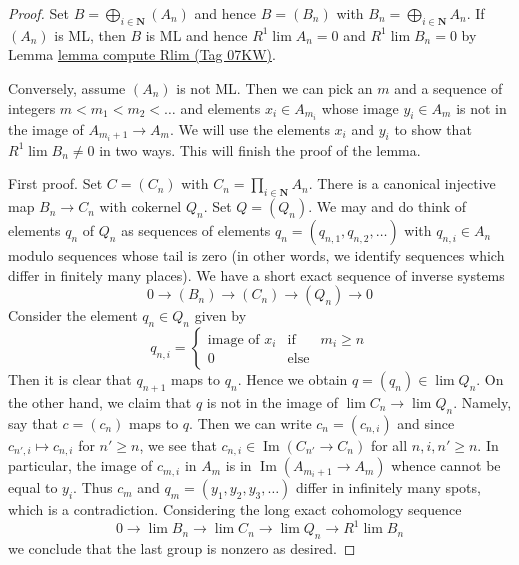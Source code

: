 \documentclass{amsart}
\theoremstyle{plain}
\theoremstyle{definition}
\theoremstyle{remark}
\numberwithin{equation}{subsection}
\def\lim{\mathop{\mathrm{lim}}\nolimits}
\def\Im{\mathop{\mathrm{Im}}}
\begin{document}
\begin{proof}
Set $B = \bigoplus_{i \in \mathbf{N}} (A_n)$ and hence
$B = (B_n)$ with $B_n = \bigoplus_{i \in \mathbf{N}} A_n$.
If $(A_n)$ is ML, then $B$ is ML and hence $R^1\lim A_n = 0$ and
$R^1\lim B_n = 0$ by Lemma \href{https://stacks.math.columbia.edu/tag/07KW}{lemma compute Rlim (Tag 07KW)}.

\medskip\noindent
Conversely, assume $(A_n)$ is not ML. Then we can pick an $m$
and a sequence of integers $m < m_1 < m_2 < \ldots$ and elements
$x_i \in A_{m_i}$ whose image $y_i \in A_m$ is not in the
image of $A_{m_i + 1} \to A_m$.
We will use the elements $x_i$ and $y_i$ to
show that $R^1\lim B_n \not = 0$ in two ways.
This will finish the proof of the lemma.

\medskip\noindent
First proof.
Set $C = (C_n)$ with $C_n = \prod_{i \in \mathbf{N}} A_n$.
There is a canonical injective map $B_n \to C_n$ with cokernel
$Q_n$. Set $Q = (Q_n)$. We may and do think of elements $q_n$ of $Q_n$
as sequences of elements $q_n = (q_{n, 1}, q_{n, 2}, \ldots)$
with $q_{n, i} \in A_n$ modulo sequences whose tail is zero
(in other words, we identify sequences which differ in
finitely many places).
We have a short exact sequence of inverse systems
$$
0 \to (B_n) \to (C_n) \to (Q_n) \to 0
$$
Consider the element $q_n \in Q_n$ given by
$$
q_{n, i} =
\left\{
\begin{matrix}
\text{image of }x_i &\text{if}& m_i \geq n \\
0 & \text{else}
\end{matrix}
\right.
$$
Then it is clear that $q_{n + 1}$ maps to $q_n$.
Hence we obtain $q = (q_n) \in \lim Q_n$.
On the other hand, we claim that $q$ is not in the image
of $\lim C_n \to \lim Q_n$. Namely, say that $c = (c_n)$
maps to $q$. Then we can write $c_n = (c_{n, i})$ and since
$c_{n', i} \mapsto c_{n, i}$ for $n' \geq n$, we see that
$c_{n, i} \in \Im(C_{n'} \to C_n)$ for all $n, i, n' \geq n$.
In particular, the image of $c_{m, i}$ in $A_m$ is in
$\Im(A_{m_i + 1} \to A_m)$ whence cannot be equal to $y_i$.
Thus $c_m$ and $q_m = (y_1, y_2, y_3, \ldots)$
differ in infinitely many spots, which
is a contradiction. Considering the long exact cohomology sequence
$$
0 \to \lim B_n \to \lim C_n \to \lim Q_n \to R^1\lim B_n
$$
we conclude that the last group is nonzero as desired.


\end{proof}
\end{document}
